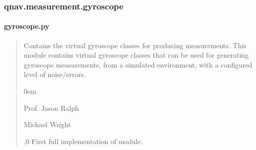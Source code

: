 \documentclass[letterpaper,10pt,english]{sphinxmanual}
\begin{document}
\sphinxstepscope


\subsubsection{qnav.measurement.gyroscope}
\label{\detokenize{modules/measurement/gyroscope:module-qnav.measurement.gyroscope}}\label{\detokenize{modules/measurement/gyroscope:qnav-measurement-gyroscope}}\label{\detokenize{modules/measurement/gyroscope::doc}}

\paragraph{gyroscope.py}
\label{\detokenize{modules/measurement/gyroscope:gyroscope-py}}\begin{quote}\begin{description}
\sphinxAtStartPar
Contains the virtual gyroscope classes for producing measurements.
This module contains virtual gyroscope classes that can be used for
generating gyroscope measurements, from a simulated environment,
with a configured level of noise/errors.

\begin{DUlineblock}{0em}
\item[] Prof. Jason Ralph \sphinxhyphen{} 
\item[] Michael Wright \sphinxhyphen{} 
\end{DUlineblock}

.0 \sphinxhyphen{} First full implementation of module.

\end{description}\end{quote}
\end{document}
